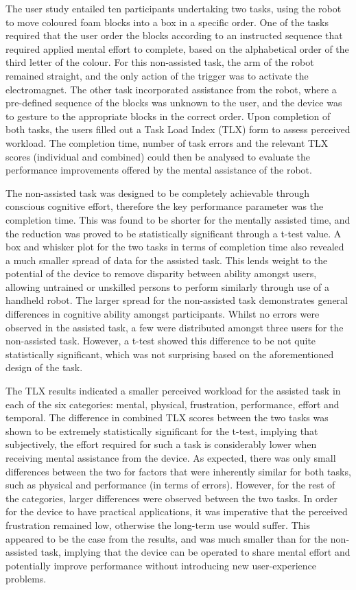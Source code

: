 \documentclass[11pt]{article}
\begin{document}
The user study entailed ten participants undertaking two tasks, using the robot to move coloured foam blocks into a box in a specific order. One of the tasks required that the user order the blocks according to an instructed sequence that required applied mental effort to complete, based on the alphabetical order of the third letter of the colour. For this non-assisted task, the arm of the robot remained straight, and the only action of the trigger was to activate the electromagnet. The other task incorporated assistance from the robot, where a pre-defined sequence of the blocks was unknown to the user, and the device was to gesture to the appropriate blocks in the correct order. Upon completion of both tasks, the users filled out a Task Load Index (TLX) form to assess perceived workload. The completion time, number of task errors and the relevant TLX scores (individual and combined) could then be analysed to evaluate the performance improvements offered by the mental assistance of the robot.

The non-assisted task was designed to be completely achievable through conscious cognitive effort, therefore the key performance parameter was the completion time. This was found to be shorter for the mentally assisted time, and the reduction was proved to be statistically significant through a t-test value. A box and whisker plot for the two tasks in terms of completion time also revealed a much smaller spread of data for the assisted task. This lends weight to the potential of the device to remove disparity between ability amongst users, allowing untrained or unskilled persons to perform similarly through use of a handheld robot. The larger spread for the non-assisted task demonstrates general differences in cognitive ability amongst participants. Whilst no errors were observed in the assisted task, a few were distributed amongst three users for the non-assisted task. However, a t-test showed this difference to be not quite statistically significant, which was not surprising based on the aforementioned design of the task.

The TLX results indicated a smaller perceived workload for the assisted task in each of the six categories: mental, physical, frustration, performance, effort and temporal. The difference in combined TLX scores between the two tasks was shown to be extremely statistically significant for the t-test, implying that subjectively, the effort required for such a task is considerably lower when receiving mental assistance from the device. As expected, there was only small differences between the two for factors that were inherently similar for both tasks, such as physical and performance (in terms of errors). However, for the rest of the categories, larger differences were observed between the two tasks. In order for the device to have practical applications, it was imperative that the perceived frustration remained low, otherwise the long-term use would suffer. This appeared to be the case from the results, and was much smaller than for the non-assisted task, implying that the device can be operated to share mental effort and potentially improve performance without introducing new user-experience problems.
\end{document}
